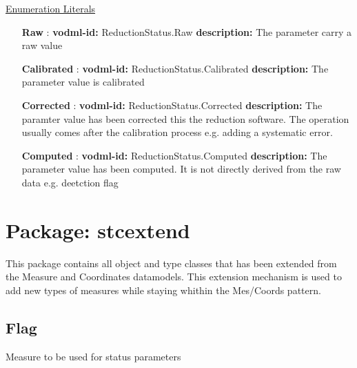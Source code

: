  \noindent \underline{Enumeration Literals}
  \vspace{-\parsep}
  \small
  \begin{itemize}
  
    \item[\textbf{Raw}]: \textbf{vodml-id:} ReductionStatus.Raw \newline
          \textbf{description:} The parameter carry a raw value
    \item[\textbf{Calibrated}]: \textbf{vodml-id:} ReductionStatus.Calibrated \newline
          \textbf{description:} The parameter value is calibrated
    \item[\textbf{Corrected}]: \textbf{vodml-id:} ReductionStatus.Corrected \newline
          \textbf{description:} The paramter value has been corrected this the reduction software. The operation usually comes after the calibration process e.g. adding a systematic error.
    \item[\textbf{Computed}]: \textbf{vodml-id:} ReductionStatus.Computed \newline
          \textbf{description:} The parameter value has been computed. It is not directly derived from the raw data e.g. deetction flag
  \end{itemize}
  \normalsize


\pagebreak
\section{Package: stcextend }


  This package contains all object and type classes that has been extended from the Measure and Coordinates datamodels. This extension mechanism is used to add new types of measures while staying whithin the Mes/Coords pattern.

  \subsection{Flag}
  \label{sect:stcextend.Flag}
    Measure to be used for status parameters

